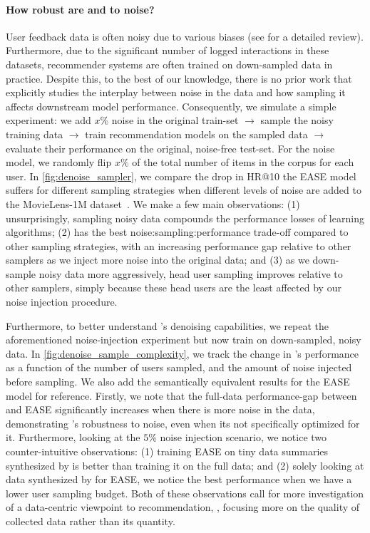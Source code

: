 \documentclass{article}
\begin{document}
\paragraph{How robust are \sampler and \model to noise?}


User feedback data is often 
noisy due to various biases (see \cite{bias_recsys} for a detailed review). Furthermore, due to the significant  number of logged interactions in these datasets, recommender systems are often trained on down-sampled data in practice.
Despite this, to the best of our knowledge, there is no prior work that explicitly studies the interplay between noise in the data and how sampling it affects downstream model performance.
Consequently, we simulate a simple experiment: we add $x$\% noise in the original train-set $\rightarrow$ sample the noisy training data $\rightarrow$ train recommendation models on the sampled data $\rightarrow$ evaluate their performance on the original, noise-free test-set. For the noise model, we randomly flip $x\%$ of the total number of items in the corpus for each user. In \cref{fig:denoise_sampler}, we compare the drop in HR@10 the EASE model suffers for different sampling strategies when different levels of noise are added to the MovieLens-1M dataset~\cite{movielens}. We make a few 
main
observations: (1) unsurprisingly, sampling noisy data compounds the performance losses of learning algorithms; (2) \sampler has the best noise:sampling:performance trade-off compared to other sampling strategies, with an increasing performance gap relative to other samplers as we inject more noise into the original data; and (3) as we down-sample noisy data more aggressively, head user sampling improves relative to other samplers, simply because these head users are the least affected by our noise injection procedure. 

Furthermore, to better understand \model's denoising capabilities, we repeat the aforementioned noise-injection experiment but now train \model on down-sampled, noisy data. In \cref{fig:denoise_sample_complexity}, we track the change in \model's performance as a function of the number of users sampled, and the amount of noise injected before sampling. We also add the semantically equivalent results for the EASE model for reference. Firstly, we note that the full-data performance-gap between \model and EASE significantly increases when there is more noise in the data, demonstrating \model's robustness to noise, even when its not specifically optimized for it. Furthermore, looking at the $5$\% noise injection scenario, we notice two counter-intuitive observations: (1) training EASE on 
tiny data summaries synthesized by \sampler is better than training it on the full data; and (2) solely looking at data synthesized by \sampler for EASE, we notice the best performance when we have a lower user sampling budget. Both of these observations call for more investigation of a data-centric viewpoint to recommendation, \ie, focusing more on the quality of collected data rather than its quantity.
\end{document}
